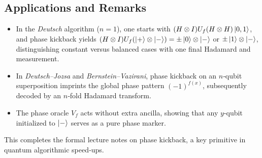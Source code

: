 \subsection{Applications and Remarks}
\begin{itemize}
	\item In the \emph{Deutsch} algorithm ($n=1$), one starts with $(H\otimes I)U_f(H\otimes H)\ket{0,1}$, and phase kickback yields $(H\otimes I)U_f(\ket{+}\otimes\ket{-})=\pm\ket{0}\otimes\ket{-}$ or $\pm\ket{1}\otimes\ket{-}$, distinguishing constant versus balanced cases with one final Hadamard and measurement.
	\item In \emph{Deutsch--Jozsa} and \emph{Bernstein--Vazirani}, phase kickback on an $n$‑qubit superposition imprints the global phase pattern $(-1)^{f(x)}$, subsequently decoded by an $n$‑fold Hadamard transform.
	\item The phase oracle $V_f$ acts without extra ancilla, showing that any $y$‑qubit initialized to $\ket{-}$ serves as a pure phase marker.
\end{itemize}

This completes the formal lecture notes on phase kickback, a key primitive in quantum algorithmic speed‑ups.
\newpage
